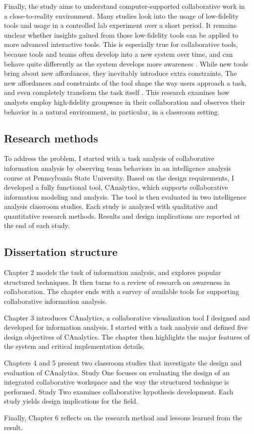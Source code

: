 Finally, the study aims to understand computer-supported collaborative work in a close-to-reality environment. Many studies look into the usage of low-fidelity tools and usage in a controlled lab experiment over a short period. It remains unclear whether insights gained from
those low-fidelity tools can be applied to more advanced interactive tools. This is especially true for collaborative tools, because tools and teams often develop into a new system over time, and can behave quite differently as the system develops more awareness \citep{Stahl2006}. While new tools bring about new affordances, they inevitably introduce extra constraints. The new affordances and constraints of the tool shape the way users approach a task, and even completely transform the
task itself \citep{Carroll1989}. This research examines how analysts employ high-fidelity groupware in their collaboration and observes their behavior in a natural environment, in particular, in a classroom setting.

\subsection{Research methods}

To address the problem, I started with a task analysis \citep{schraagen2000cognitive} of collaborative information analysis by observing team behaviors in an intelligence analysis course at Pennsylvania State University. Based on the design requirements, I developed a fully functional tool, CAnalytics, which supports collaborative information modeling and analysis. The tool is then evaluated in two intelligence analysis classroom studies. Each study is analyzed with qualitative and quantitative research methods. Results and design implications are reported at the end of each  study.

\subsection{Dissertation structure}

Chapter 2 models the task of information analysis, and explores popular structured techniques. It then turns to a review of research on awareness in collaboration. The chapter ends with a survey of available tools for supporting collaborative information analysis. 

Chapter 3 introduces CAnalytics, a collaborative visualization tool I designed and developed for information analysis. I started with a task analysis and defined five design objectives of CAnalytics. The chapter then highlights the major features of the system and critical implementation details. 

Chapters 4 and 5 present two classroom studies that investigate the design and evaluation of CAnalytics. Study One focuses on evaluating the design of an integrated collaborative workspace and the way the structured technique is performed. Study Two examines collaborative hypothesis development. Each study yields design implications for the field.

Finally, Chapter 6 reflects on the research method and lessons learned from the result. 
